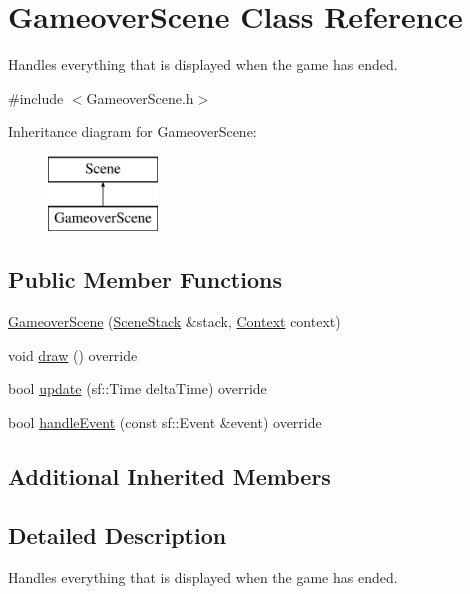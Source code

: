 \hypertarget{class_gameover_scene}{}\section{Gameover\+Scene Class Reference}
\label{class_gameover_scene}


Handles everything that is displayed when the game has ended.  




{\ttfamily \#include $<$Gameover\+Scene.\+h$>$}

Inheritance diagram for Gameover\+Scene\+:\begin{figure}[H]
\begin{center}
\leavevmode
\includegraphics[height=2.000000cm]{class_gameover_scene}
\end{center}
\end{figure}
\subsection*{Public Member Functions}
\begin{DoxyCompactItemize}
\item 
\hyperlink{class_gameover_scene_a8d57771f3b59da589d2341d4d3b9d299}{Gameover\+Scene} (\hyperlink{class_scene_stack}{Scene\+Stack} \&stack, \hyperlink{struct_scene_1_1_context}{Context} context)
\item 
void \hyperlink{class_gameover_scene_ae8a5e79e002d0e79edaec9ec1b0df902}{draw} () override
\item 
bool \hyperlink{class_gameover_scene_a6b7f650af840f54c78b4fb1cdf2010df}{update} (sf\+::\+Time delta\+Time) override
\item 
bool \hyperlink{class_gameover_scene_ac951bc51d29e2d14807e3da2e885ccc8}{handle\+Event} (const sf\+::\+Event \&event) override
\end{DoxyCompactItemize}
\subsection*{Additional Inherited Members}


\subsection{Detailed Description}
Handles everything that is displayed when the game has ended. 



